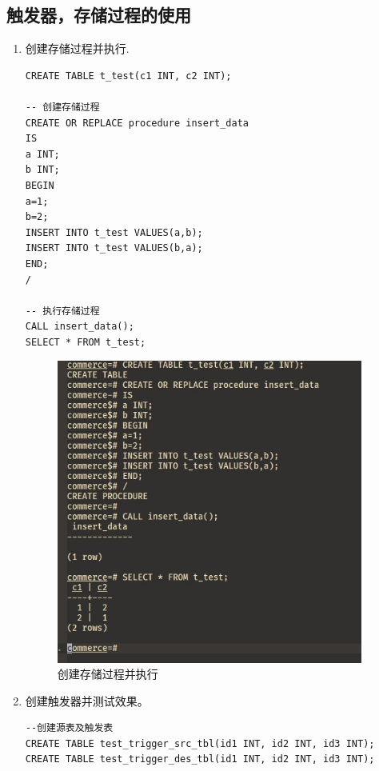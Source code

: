 \subsection{触发器，存储过程的使用}
\begin{enumerate}
  \item 创建存储过程并执行.
\begin{center}
\begin{verbatim}
CREATE TABLE t_test(c1 INT, c2 INT);

-- 创建存储过程
CREATE OR REPLACE procedure insert_data
IS
a INT;
b INT;
BEGIN
a=1;
b=2;
INSERT INTO t_test VALUES(a,b);
INSERT INTO t_test VALUES(b,a);
END;
/

-- 执行存储过程
CALL insert_data();
SELECT * FROM t_test;
\end{verbatim}
\end{center}
\begin{figure}[H]
  \begin{center}
    \includegraphics[width=0.95\textwidth]{./figures/procedure.jpg}
  \end{center}
  \caption{创建存储过程并执行}
\end{figure}
  \item 创建触发器并测试效果。
\begin{center}
\begin{verbatim}
--创建源表及触发表
CREATE TABLE test_trigger_src_tbl(id1 INT, id2 INT, id3 INT);
CREATE TABLE test_trigger_des_tbl(id1 INT, id2 INT, id3 INT);


\end{verbatim}
\end{center}
\end{enumerate}
